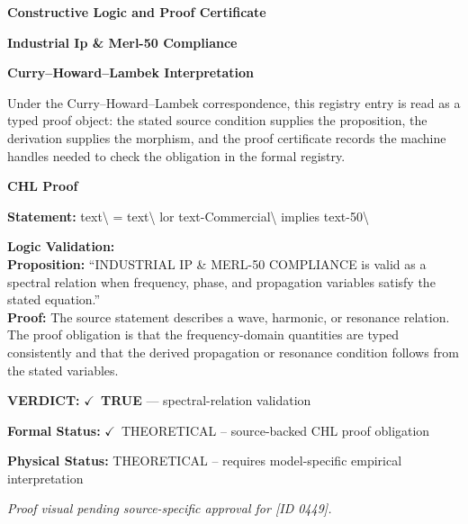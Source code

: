 \clearpage
\begingroup\tzpsupportsetup
\noindent\textbf{\fontsize{10.8pt}{12.8pt}\selectfont [ID 0449] Constructive Logic and Proof Certificate}\par
\noindent\textbf{\fontsize{10pt}{12pt}\selectfont Industrial Ip \& Merl-50 Compliance}\par
\vspace{0.45em}
\begingroup
\footnotesize
\setlength{\parskip}{0.22em}
\setlength{\parindent}{0pt}
\noindent\textbf{Curry--Howard--Lambek Interpretation}\par
Under the Curry--Howard--Lambek correspondence, this registry entry is read as a typed proof
object: the stated source condition supplies the proposition, the derivation supplies the
morphism, and the proof certificate records the machine handles needed to check the obligation
in the formal registry.

\vspace{0.45em}
\noindent\textbf{CHL Proof}\par
\textbf{Statement:} text\textbackslash{} = text\textbackslash{} lor text-Commercial\textbackslash{} implies text-50\textbackslash{}

\textbf{Logic Validation:}\\
\textbf{Proposition:} ``INDUSTRIAL IP \& MERL-50 COMPLIANCE is valid as a spectral relation when frequency,
phase, and propagation variables satisfy the stated equation.''\\
\textbf{Proof:} The source statement describes a wave, harmonic, or resonance relation. The proof
obligation is that the frequency-domain quantities are typed consistently and that the
derived propagation or resonance condition follows from the stated variables.

\textbf{VERDICT:} \ensuremath{\checkmark}\ \textbf{TRUE} --- spectral-relation validation

\textbf{Formal Status:} \ensuremath{\checkmark}\ THEORETICAL -- source-backed CHL proof obligation

\textbf{Physical Status:} THEORETICAL -- requires model-specific empirical interpretation
\par\vspace{0.45em}
\par
\vfill
\begingroup\footnotesize\itshape
Proof visual pending source-specific approval for [ID 0449].
\par\endgroup
\vfill
\endgroup
\endgroup
